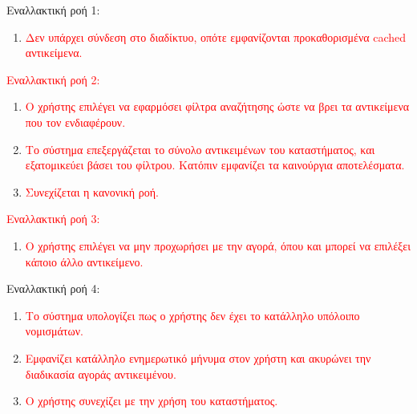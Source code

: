 Εναλλακτική ροή 1:
\begin{enumerate}[label=2.\alph*.,ref=2.\alph*]
    \item \textcolor{red}{Δεν υπάρχει σύνδεση στο διαδίκτυο, οπότε εμφανίζονται προκαθορισμένα cached αντικείμενα.}
\end{enumerate}

\textcolor{red}{Εναλλακτική ροή 2:}
\begin{enumerate}[label=3.\alph*.,ref=3.\alph*]
    \item \textcolor{red}{Ο χρήστης επιλέγει να εφαρμόσει φίλτρα αναζήτησης ώστε να βρει τα αντικείμενα που τον ενδιαφέρουν.}
    \item \textcolor{red}{Το σύστημα επεξεργάζεται το σύνολο αντικειμένων του καταστήματος, και εξατομικεύει βάσει του φίλτρου. Κατόπιν εμφανίζει τα καινούργια αποτελέσματα.}
    \item \textcolor{red}{Συνεχίζεται η κανονική ροή.}
\end{enumerate}

\textcolor{red}{Εναλλακτική ροή 3:}
\begin{enumerate}[label=4.\alph*.,ref=4.\alph*]
    \item \textcolor{red}{Ο χρήστης επιλέγει να μην προχωρήσει με την αγορά, όπου και μπορεί να επιλέξει κάποιο άλλο αντικείμενο.}
\end{enumerate}

Εναλλακτική ροή 4:
\begin{enumerate}[label=7.\alph*.,ref=7.\alph*]
    \item \textcolor{red}{Το σύστημα υπολογίζει πως ο χρήστης δεν έχει το κατάλληλο υπόλοιπο νομισμάτων.}
    \item \textcolor{red}{Εμφανίζει κατάλληλο ενημερωτικό μήνυμα στον χρήστη και ακυρώνει την διαδικασία αγοράς αντικειμένου.}
    \item \textcolor{red}{Ο χρήστης συνεχίζει με την χρήση του καταστήματος.}
\end{enumerate}

\newpage
